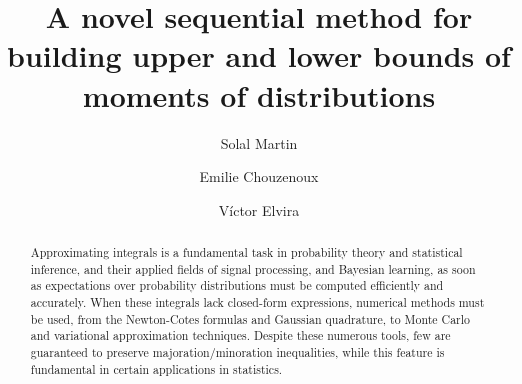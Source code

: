 \documentclass[review]{elsarticle}
\begin{document}
\begin{frontmatter}

\title{A novel sequential method for building upper and lower bounds of moments of distributions}


\author[mymainaddress]{Solal Martin}

\author[mysecondaryaddress]{Emilie Chouzenoux}

\author[mythirdadress]{Víctor Elvira}

\address[mymainaddress]{Toulouse School of Economics, France}
\address[mysecondaryaddress]{
Universit\'e Paris-Saclay, Inria, CentraleSupélec, CVN, France}
\address[mythirdadress]{School of Mathematics, University of Edinburgh, UK}
 
\begin{abstract}
Approximating integrals is a fundamental task in probability theory and statistical inference, and their applied fields of signal processing, and Bayesian learning, as soon as expectations over probability distributions must be computed efficiently and accurately. 
When these integrals lack closed-form expressions, numerical methods must be used, from the Newton-Cotes formulas and Gaussian quadrature, to Monte Carlo and variational approximation techniques. Despite these numerous tools, few are guaranteed to preserve majoration/minoration inequalities, while this feature is fundamental in certain applications in statistics. %



\end{abstract}
\end{frontmatter}
\end{document}
